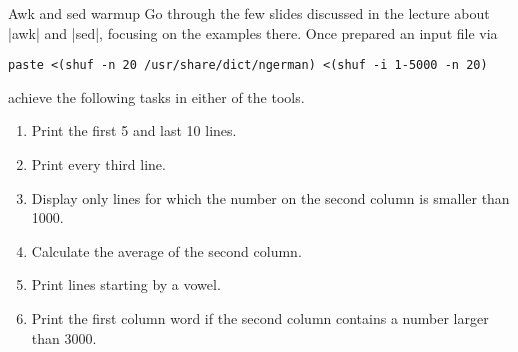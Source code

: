
\begin{exercise}[Instructive]{Awk and sed warmup}
    Go through the few slides discussed in the lecture about \bash|awk| and \bash|sed|, focusing on the examples there.
    Once prepared an input file via
    \begin{lstlisting}[style=MyBash]
        paste <(shuf -n 20 /usr/share/dict/ngerman) <(shuf -i 1-5000 -n 20)
    \end{lstlisting}
    achieve the following tasks in either of the tools.
    \begin{enumerate}
        \item Print the first 5 and last 10 lines.
        \item Print every third line.
        \item Display only lines for which the number on the second column is smaller than 1000.
        \item Calculate the average of the second column.
        \item Print lines starting by a vowel.
        \item Print the first column word if the second column contains a number larger than 3000.
    \end{enumerate}
\end{exercise}

\bigskip

